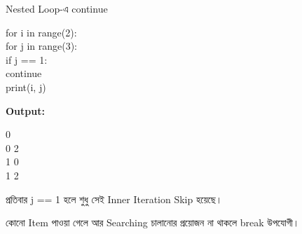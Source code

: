 \begin{codeoutputbox}{Nested Loop-এ \textenglish{\ttfamily continue}}

\noindent
\begin{minipage}[t]{0.55\linewidth}
\codeheading

\begin{english}
\ttfamily
for i in range(2):\\
\hspace*{4mm}for j in range(3):\\
\hspace*{8mm}if j == 1:\\
\hspace*{12mm}continue\\
\hspace*{8mm}print(i, j)
\end{english}

\end{minipage}
\hfill
\begin{minipage}[t]{0.41\linewidth}
\outputheading

\textbf{Output:}

\begin{english}
 0\\
0 2\\
1 0\\
1 2
\end{english}

\medskip

প্রতিবার
\textenglish{\ttfamily j == 1}
হলে শুধু সেই Inner Iteration Skip হয়েছে।

\end{minipage}

\end{codeoutputbox}



কোনো Item পাওয়া গেলে আর Searching চালানোর প্রয়োজন না থাকলে
\textenglish{\ttfamily break}
উপযোগী।

